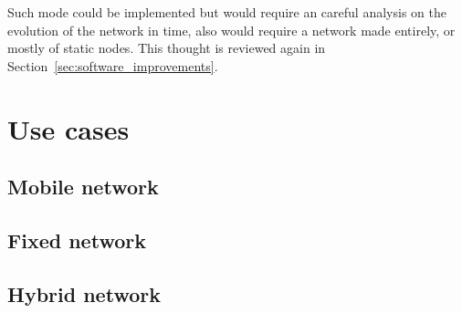 		Such mode could be implemented but would require an careful analysis on the evolution of the network in time, also would require a network made entirely, or mostly of static nodes.
		This thought is reviewed again in Section~\ref{sec:software_improvements}.
			
	\section{Use cases}
		
		
		\subsection{Mobile network}
		
		\subsection{Fixed network}
		
		\subsection{Hybrid network}